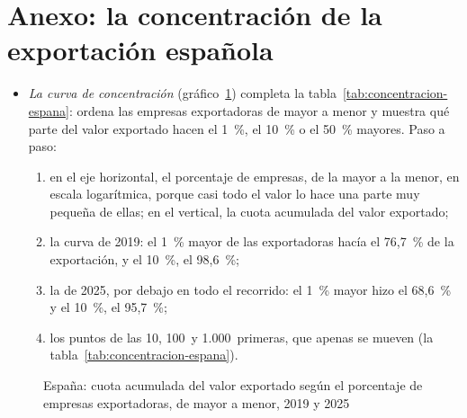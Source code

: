 \documentclass[11pt]{article}
\begin{document}
\section{Anexo: la concentración de la exportación española}\label{anexo:concentracion}

\begin{itemize}
\item \emph{La curva de concentración} (gráfico~\ref{fig:concentracion-espana}) completa la tabla~\ref{tab:concentracion-espana}: ordena las empresas exportadoras de mayor a menor y muestra qué parte del valor exportado hacen el 1~\%, el 10~\% o el 50~\% mayores. Paso a paso:
  \begin{enumerate}
  \item en el eje horizontal, el porcentaje de empresas, de la mayor a la menor, en escala logarítmica, porque casi todo el valor lo hace una parte muy pequeña de ellas; en el vertical, la cuota acumulada del valor exportado;
  \item la curva de 2019: el 1~\% mayor de las exportadoras hacía el 76,7~\% de la exportación, y el 10~\%, el 98,6~\%\nocite{AEAT2026MicrodatosEmpresas};
  \item la de 2025, por debajo en todo el recorrido: el 1~\% mayor hizo el 68,6~\% y el 10~\%, el 95,7~\%\nocite{AEAT2026MicrodatosEmpresas};
  \item los puntos de las 10, 100~y 1.000~primeras, que apenas se mueven (la tabla~\ref{tab:concentracion-espana}).
  \end{enumerate}
\end{itemize}

\begin{figure}[H]
\centering
\caption{España: cuota acumulada del valor exportado según el porcentaje de empresas exportadoras, de mayor a menor, 2019 y 2025}\label{fig:concentracion-espana}
\end{figure}
\end{document}
